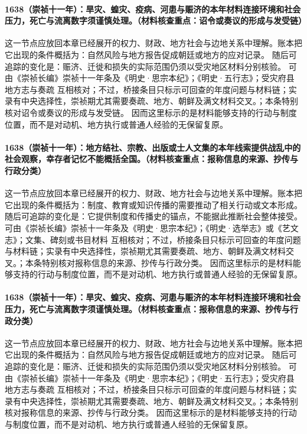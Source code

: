 \paragraph{1638（崇祯十一年）：旱灾、蝗灾、疫病、河患与赈济的本年材料连接环境和社会压力，死亡与流离数字须谨慎处理。（材料核查重点：诏令或奏议的形成与发受链）} 这一节点应放回本章已经展开的权力、财政、地方社会与边地关系中理解。账本把它出现的条件概括为：自然风险与地方报告促成朝廷或地方的应对记录。 随后可追踪的变化是：赈济、迁徙和损失的实际范围仍须以受灾地区材料分别核验。 可由《崇祯长编》崇祯十一年条及《明史·思宗本纪》；《明史·五行志》；受灾府县地方志与奏疏 互相核对；不过，桥接条目只标示可回查的年度问题与材料链；实录有中央选择性，崇祯期尤其需要奏疏、地方、朝鲜及满文材料交叉。；本条特别核对诏令或奏议的形成与发受链。 因而这里标示的是材料能够支持的行动与制度位置，而不是对动机、地方执行或普通人经验的无保留复原。

\paragraph{1638（崇祯十一年）：地方结社、宗教、出版或士人文集的本年线索提供战乱中的社会观察，幸存者记忆不能概括全国。（材料核查重点：报称信息的来源、抄传与行政分类）} 这一节点应放回本章已经展开的权力、财政、地方社会与边地关系中理解。账本把它出现的条件概括为：制度、教育或知识传播的需要推动了相关行动或文本形成。 随后可追踪的变化是：它提供制度和传播史的锚点，不能据此推断社会整体接受。 可由《崇祯长编》崇祯十一年条及《明史·思宗本纪》；《明史·选举志》或《艺文志》；文集、碑刻或书目材料 互相核对；不过，桥接条目只标示可回查的年度问题与材料链；实录有中央选择性，崇祯期尤其需要奏疏、地方、朝鲜及满文材料交叉。；本条特别核对报称信息的来源、抄传与行政分类。 因而这里标示的是材料能够支持的行动与制度位置，而不是对动机、地方执行或普通人经验的无保留复原。

\paragraph{1638（崇祯十一年）：旱灾、蝗灾、疫病、河患与赈济的本年材料连接环境和社会压力，死亡与流离数字须谨慎处理。（材料核查重点：报称信息的来源、抄传与行政分类）} 这一节点应放回本章已经展开的权力、财政、地方社会与边地关系中理解。账本把它出现的条件概括为：自然风险与地方报告促成朝廷或地方的应对记录。 随后可追踪的变化是：赈济、迁徙和损失的实际范围仍须以受灾地区材料分别核验。 可由《崇祯长编》崇祯十一年条及《明史·思宗本纪》；《明史·五行志》；受灾府县地方志与奏疏 互相核对；不过，桥接条目只标示可回查的年度问题与材料链；实录有中央选择性，崇祯期尤其需要奏疏、地方、朝鲜及满文材料交叉。；本条特别核对报称信息的来源、抄传与行政分类。 因而这里标示的是材料能够支持的行动与制度位置，而不是对动机、地方执行或普通人经验的无保留复原。

